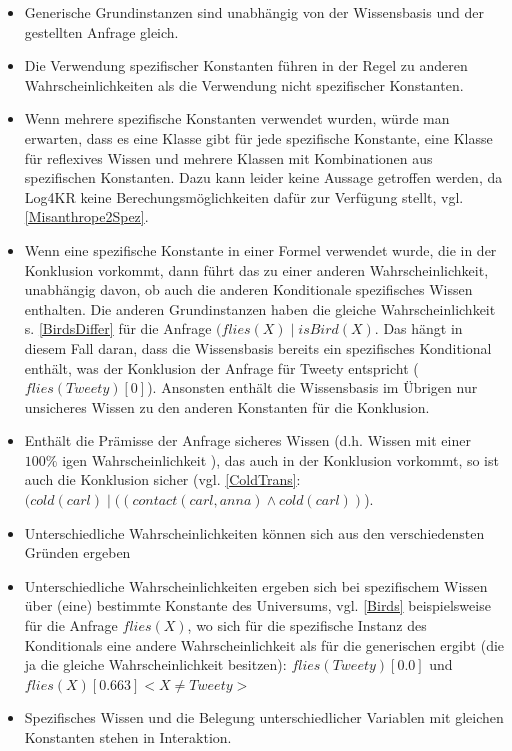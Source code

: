 \documentclass[a4paper, 11pt]{book}
\begin{document}
\begin{itemize}
	\item 	Generische Grundinstanzen  sind unabhängig von der Wissensbasis und der gestellten Anfrage gleich.
	\item Die Verwendung spezifischer Konstanten   führen in der Regel zu anderen Wahrscheinlichkeiten als die Verwendung nicht spezifischer Konstanten.
	\item Wenn mehrere spezifische Konstanten verwendet wurden, würde man erwarten, dass es eine Klasse gibt für jede spezifische Konstante, eine Klasse für reflexives Wissen und mehrere Klassen mit Kombinationen aus spezifischen Konstanten. Dazu kann leider keine Aussage getroffen werden, da Log4KR keine Berechungsmöglichkeiten dafür zur Verfügung stellt, vgl.  \ref{Misanthrope2Spez}.
	\item Wenn eine spezifische Konstante in einer Formel verwendet wurde, die in der Konklusion vorkommt, dann führt das zu einer anderen Wahrscheinlichkeit, unabhängig davon, ob auch die anderen Konditionale spezifisches Wissen enthalten. Die anderen Grundinstanzen haben die gleiche Wahrscheinlichkeit s. \ref{BirdsDiffer} für die Anfrage $ (flies(X) \mid isBird(X)$. Das hängt in diesem Fall daran, dass die Wissensbasis bereits ein spezifisches Konditional enthält, was der Konklusion der Anfrage für Tweety entspricht ($ flies(Tweety)[0] $). Ansonsten enthält die Wissensbasis im Übrigen nur unsicheres Wissen zu den anderen Konstanten für die Konklusion.
	\item Enthält die Prämisse der Anfrage sicheres Wissen (d.h. Wissen mit einer $ 100 \%  $ igen Wahrscheinlichkeit ), das auch in der Konklusion vorkommt, so ist auch die Konklusion sicher (vgl. \ref{ColdTrans}:$(cold(carl) \mid ((contact(carl,anna)  \land cold(carl)) $). 
	\item Unterschiedliche Wahrscheinlichkeiten können sich aus den verschiedensten Gründen ergeben
	\item Unterschiedliche Wahrscheinlichkeiten ergeben sich bei spezifischem Wissen über (eine) bestimmte Konstante des Universums, vgl. \ref{Birds} beispielsweise für die Anfrage $ flies(X) $, wo sich für die spezifische Instanz des Konditionals eine andere Wahrscheinlichkeit als für die generischen ergibt (die ja die gleiche Wahrscheinlichkeit besitzen): $ flies(Tweety)[0.0] $ und $ flies(X)[0.663]<X \neq Tweety> $
	\item Spezifisches Wissen und die Belegung unterschiedlicher Variablen mit gleichen Konstanten stehen in Interaktion.

\end{itemize}
\end{document}
